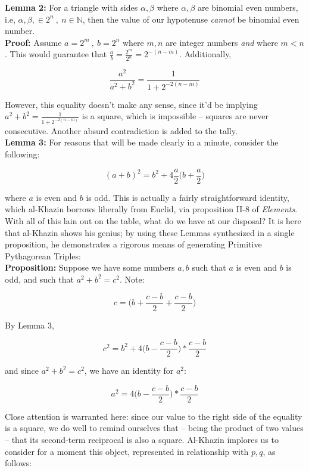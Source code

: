 \documentclass{article}
\begin{document}
\textbf{Lemma 2:} For a triangle with sides $\alpha,\beta$ where $\alpha,\beta$ are binomial even numbers, i.e, $\alpha,\beta, \in 2^n \ , \ n \in \mathbb{N}$, then the value of our hypotenuse \textit{cannot} be binomial even number. \\

\textbf{Proof:} Assume $a=2^m \ , \ b=2^n$ where $m,n$ are integer numbers \textit{and} where $m<n$. This would guarantee that $\frac{a}{b} = \frac{2^m}{2^n} = 2^{-(n-m)}$. Additionally, 

$$ \frac{a^2}{a^2 + b^2} = \frac{1}{1+2^{-2(n-m)}} $$

However, this equality doesn't make any sense, since it'd be implying $a^2 + b^2 = \frac{1}{1+2^{-2(n-m)}}$ is a square, which is impossible -- squares are never consecutive. Another absurd contradiction is added to the tally.\\

\textbf{Lemma 3:} For reasons that will be made clearly in a minute, consider the following:

$$ (a+b)^2 = b^2 + 4 \frac{a}{2} \Big( b+ \frac{a}{2} \Big) $$

where $a$ is even and $b$ is odd. This is actually a fairly straightforward identity, which al-Khazin borrows liberally from Euclid, via proposition II-8 of \textit{Elements}. With all of this lain out on the table, what do we have at our disposal? It is here that al-Khazin shows his genius; by using these Lemmas synthesized in a single proposition, he demonstrates a rigorous means of generating Primitive Pythagorean Triples: \\

\textbf{Proposition:} Suppose we have some numbers $a,b$ such that $a$ is even and $b$ is odd, and such that $a^2 + b^2 = c^2$. Note:

$$ c = \Big( b + \frac{c-b}{2} + \frac{c-b}{2} \Big) $$

By Lemma 3, 

$$ c^2 = b^2 + 4 \Big( b - \frac{c-b}{2} \Big)*\frac{c-b}{2} $$

and since $a^2 + b^2 = c^2$, we have an identity for $a^2$:

$$ a^2 = 4 \Big( b - \frac{c-b}{2} \Big)*\frac{c-b}{2} $$

Close attention is warranted here: since our value to the right side of the equality is a square, we do well to remind ourselves that -- being the product of two values -- that its second-term reciprocal is also a square. Al-Khazin implores us to consider for a moment this object, represented in relationship with $p,q$, as follows:
\end{document}
